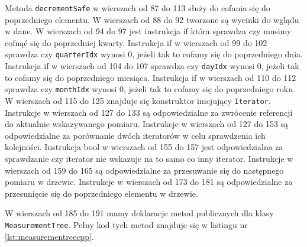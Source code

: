 Metoda \texttt{decrementSafe} w wierszach od 87 do 113 służy do cofania się do poprzedniego elementu. W wierszach od 88 do 92 tworzone są wycinki do wglądu w dane. W wierszach od 94 do 97 jest instrukcja if która sprawdza czy musimy cofnąć się do poprzedniej kwarty.
Instrukcja if w wierszach od 99 do 102 sprawdza czy \texttt{quarterIdx} wynosi 0, jeżeli tak to cofamy się do poprzedniego dnia.
Instrukcja if w wierszach od 104 do 107 sprawdza czy \texttt{dayIdx} wynosi 0, jeżeli tak to cofamy się do poprzedniego miesiąca.
Instrukcja if w wierszach od 110 do 112 sprawdza czy \texttt{monthIdx} wynosi 0, jeżeli tak to cofamy się do poprzedniego roku.
W wierszach od 115 do 125 znajduje się konstruktor inicjujący \texttt{Iterator}. Instrukcje w wierszach od 127 do 133 są odpowiedzialne za zwrócenie referencji do aktualnie wskazywanego pomiaru. Instrukcje w wierszach od 127 do 153 są odpowiedzialne za porównanie dwóch iteratorów w celu sprawdzenia ich kolejności. Instrukcja bool w wierszach od 155 do 157 jest odpowiedzialna za sprawdzanie czy iterator nie wskazuje na to samo co inny iterator. Instrukcje w wierszach od 159 do 165 są odpowiedzialne za przesuwanie się do następnego pomiaru w drzewie. Instrukcje w wierszach od 173 do 181 są odpowiedzialne za przesunięcie się do poprzedniego elementu w drzewie.

W wierszach od 185 do 191 mamy deklaracje metod publicznych dla klasy \texttt{MeasurementTree}. Pełny kod tych metod znajduje się w listingu nr \ref{lst:measurementreecpp}.

